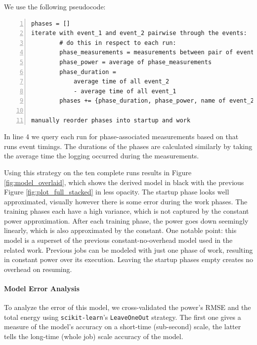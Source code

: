 We use the following pseudocode: 

\begin{minipage}{\linewidth}
    \begin{lstlisting}[frame=single, numbers=left, caption={Pseudocode for turning RoBERTa's power measurements into \modelname}, basicstyle=\ttfamily, label={listing:fitting_swap}]
phases = []
iterate with event_1 and event_2 pairwise through the events:
        # do this in respect to each run:
        phase_measurements = measurements between pair of events
        phase_power = average of phase_measurements
        phase_duration = 
            average time of all event_2
            - average time of all event_1
        phases += {phase_duration, phase_power, name of event_2}
        
manually reorder phases into startup and work
    \end{lstlisting}
\end{minipage}

In line 4 we query each run for phase-associated measurements based on that runs event timings. 
The durations of the phases are calculated similarly by taking the average time the logging occurred during the measurements.

Using this strategy on the ten complete runs results in Figure \ref{fig:model_overlaid}, which shows the derived model in black with the previous Figure \ref{fig:plot_full_stacked} in less opacity. 
The startup phase looks well approximated, visually however there is some error during the work phases.
The training phases each have a high variance, which is not captured by the constant power approximation. After each training  phase, the power goes down seemingly linearly, which is also approximated by the constant.
One notable point: this model is a superset of the previous constant-no-overhead model used in the related work.
Previous jobs can be modeled with just one phase of work, resulting in constant power over its execution. Leaving the startup phases empty creates no overhead on resuming.

\paragraph{Model Error Analysis}

To analyze the error of this model, we cross-validated the power's RMSE and the total energy using \verb|scikit-learn|'s \verb|LeaveOneOut| strategy. 
The first one gives a measure of the model's accuracy on a short-time (sub-second) scale, the latter tells the long-time (whole job) scale accuracy of the model.

